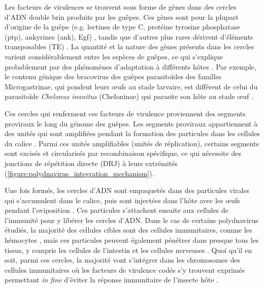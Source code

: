 Les facteurs de virulences se trouvent sous forme de gènes dans des cercles d'ADN double brin produits par les guêpes. Ces gènes sont pour la plupart d'origine de la guêpe (e.g. lectines de type C, protéine tyrosine phosphatase (ptp), ankyrines (ank), Egf) \citep{desjardins_comparative_2008, gasmi_recurrent_2015,huguet_evolution_2012}, tandis que d'autres plus rares dérivent d'éléments transposables (TE) \citep{zhang_chromosome-level_2019, gauthier_chromosomal_2021}. La quantité et la nature des gènes présents dans les cercles varient considérablement entre les espèces de guêpes, ce qui s'explique probablement par des phénomènes d'adaptation à différents hôtes \citep{bezier_functional_2013,serbielle_evolutionary_2012, strand_polydnaviruses_2012,cerqueira_de_araujo_chelonus_2022,mao_complete_2022}.
Par exemple, le contenu génique des bracovirus des guêpes parasitoïdes des familles Microgastrinae, qui pondent leurs œufs au stade larvaire, est différent de celui du parasitoïde \textit{Chelonus inanitus} (Cheloninae) qui parasite son hôte au stade œuf \citep{weber_transcriptional_2007, mao_complete_2022, cerqueira_de_araujo_chelonus_2022}. 

Ces cercles qui renferment ces facteurs de virulence proviennent des segments proviraux le long du génome des guêpes. Les segments proviraux appartiennent à des unités qui sont amplifiées pendant la formation des particules dans les cellules du calice \citep{louis_bracovirus_2013, burke_microplitis_2015}. Parmi ces unités amplifiables (unités de réplication), certains segments sont excisés et circularisés par recombinaison spécifique, ce qui nécessite des jonctions de répétition directe (DRJ) à leurs extrémités \citep{beck_encapsidated_2011,desjardins_structure_2007}(\figurename{\ref{figure:polydnavirus_integration_mechanism}}).

Une fois formés, les cercles d'ADN sont empaquetés dans des particules virales qui s'accumulent dans le calice, puis sont injectées dans l'hôte avec les œufs pendant l'oviposition \citep{strand_polydnaviruses_2014}. Ces particules s'attachent ensuite aux cellules de l'immunité pour y libérer les cercles d'ADN.  Dans le cas de certains polydnavirus étudiés, la majorité des cellules cibles sont des cellules immunitaires, comme les hémocytes \citep{beck_novel_2007}, mais ces particules peuvent également pénétrer dans presque tous les tissus, y compris les cellules de l'intestin et les cellules nerveuses \citep{beck_novel_2007, muller_genome-wide_2021}. Quoi qu'il en soit, parmi ces cercles, la majorité vont s'intégrer dans les chromosomes des cellules immunitaires \citep{chevignon_cotesia_2018, muller_genome-wide_2021} où les facteurs de virulence codés s'y trouvent exprimés \citep{pruijssers_ptp-h2_2007} permettant \textit{in fine} d’éviter la réponse immunitaire de l’insecte hôte \citep{drezen_endogenous_2017}.

